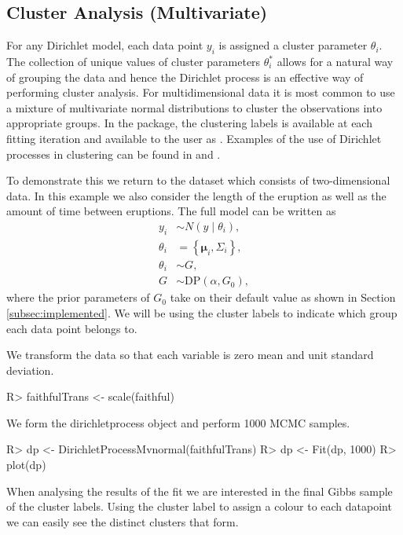 \documentclass[nojss]{jss}
\begin{document}
\subsection{Cluster Analysis (Multivariate)} \label{subsec:clusteranalysis}
For any Dirichlet model, each data point $y_i$ is assigned a cluster parameter $\theta _i$. The collection of unique values of cluster parameters $\theta _i ^*$ allows for a natural way of grouping the data and hence the Dirichlet process is an effective way of performing cluster analysis. For multidimensional data it is most common to use a mixture of multivariate normal distributions to cluster the observations into appropriate groups. In the  package, the clustering labels is available at each fitting iteration and available to the user as . Examples of the use of Dirichlet processes in clustering can be found in \cite{teh_sharing_2005} and \cite{kim_variable_2006}.

To demonstrate this we return to the  dataset which consists of two-dimensional data. In this example we also consider the length of the eruption as well as the amount of time between eruptions. The full model can be written as
\begin{align*}
y _i & \sim N (y \mid \theta_i ), \\
\theta_i & =  \left\lbrace \boldsymbol{\mu}_i, \Sigma _i \right\rbrace , \\
\theta _i & \sim G, \\
G & \sim \text{DP} ( \alpha, G_0 ),
\end{align*}
where the prior parameters of $G_0$ take on their default value as shown in Section \ref{subsec:implemented}. We will be using the cluster labels to indicate which group each data point belongs to.

We transform the data so that each variable is zero mean and unit standard deviation.
\begin{Schunk}
\begin{Sinput}
R> faithfulTrans <- scale(faithful)
\end{Sinput}
\end{Schunk}
We form the dirichletprocess object and perform 1000 MCMC samples.
\begin{Schunk}
\begin{Sinput}
R> dp <-  DirichletProcessMvnormal(faithfulTrans)
R> dp <- Fit(dp, 1000)
R> plot(dp)
\end{Sinput}
\end{Schunk}
When analysing the results of the fit we are interested in the final Gibbs sample of the cluster labels. Using the cluster label to assign a colour to each datapoint we can easily see the distinct clusters that form.
\end{document}
